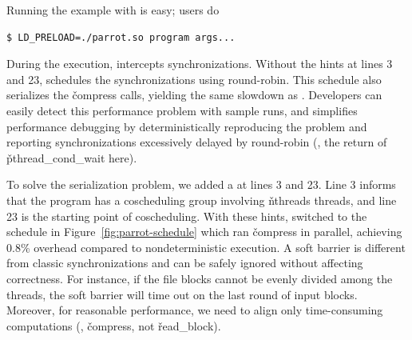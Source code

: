 

Running the example with \parrot is easy; users do
\vspace{-2 mm}
\begin{small}
\begin{verbatim}
$ LD_PRELOAD=./parrot.so program args...
\end{verbatim}
\end{small}
\vspace{-2 mm}


\noindent
During the execution, \parrot intercepts \pthread synchronizations.  Without
the hints at lines 3 and 23, \parrot schedules the synchronizations using round-robin. 
This schedule also serializes the \v{compress} calls, yielding the same slowdown as \dthreads.
Developers can easily detect this performance problem with
sample runs, and \parrot simplifies performance debugging by
deterministically reproducing the problem and reporting synchronizations
excessively delayed  by round-robin
(\eg, the return of \v{pthread\_cond\_wait} here).

To solve the serialization problem, we added a \compute at lines 3 and 23.  Line 3
informs \parrot that the program has a coscheduling group involving
\v{nthreads} threads, and line 23 is the starting point of coscheduling.  With
these hints, \parrot switched to the schedule in
Figure~\ref{fig:parrot-schedule} which ran \v{compress} in parallel,
achieving 0.8\% overhead compared to nondeterministic execution. A soft barrier is
different from classic synchronizations and can be safely 
ignored without affecting correctness.  For
instance, if the file blocks cannot be evenly divided among
the threads, the soft barrier will time out on the last round of input blocks.  Moreover,
for reasonable performance, we need to align only time-consuming computations
(\eg, \v{compress}, not \v{read\_block}).

